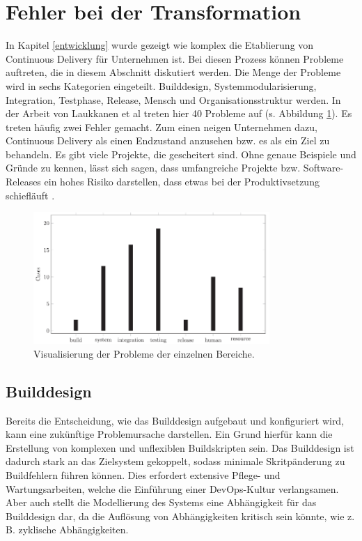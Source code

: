 \section{Fehler bei der Transformation} \label{Fehler bei der Transformation}
In Kapitel \ref{entwicklung} wurde gezeigt wie komplex die Etablierung von Continuous Delivery für Unternehmen ist. Bei diesen Prozess können Probleme auftreten, die in diesem Abschnitt diskutiert werden. Die Menge der Probleme wird in sechs Kategorien eingeteilt. Builddesign, Systemmodularisierung, Integration, Testphase, Release, Mensch und Organisationsstruktur werden. In der Arbeit von Laukkanen et al treten hier 40 Probleme auf (s. Abbildung \ref{studie}). Es treten häufig zwei Fehler gemacht. Zum einen neigen Unternehmen dazu, Continuous Delivery als einen Endzustand anzusehen bzw. es als ein Ziel zu behandeln. Es gibt viele Projekte, die gescheitert sind. Ohne genaue Beispiele und Gründe zu kennen, lässt sich sagen, dass umfangreiche Projekte bzw. Software-Releases ein hohes Risiko darstellen, dass etwas bei der Produktivsetzung schiefläuft \cite{Laukkanen.2017}. 

\begin{figure}[ht]
	\centering
	\includegraphics[width=0.8\textwidth,]{images/Transformationproblems}
	\caption{Visualisierung der Probleme der einzelnen Bereiche\cite{Laukkanen.2017}.}
	\label{studie}
\end{figure}

\subsection{Builddesign} \label{builddesgin}
Bereits die Entscheidung, wie das Builddesign aufgebaut und konfiguriert wird, kann eine zukünftige Problemursache darstellen. Ein Grund hierfür kann die Erstellung von komplexen und unflexiblen Buildskripten sein. Das Builddesign ist dadurch stark an das Zielsystem gekoppelt, sodass minimale Skritpänderung zu Buildfehlern führen können. Dies erfordert extensive Pflege- und Wartungsarbeiten, welche die Einführung einer DevOps-Kultur verlangsamen. Aber auch stellt die Modellierung des Systems eine Abhängigkeit für das Builddesign dar, da die Auflösung von Abhängigkeiten kritisch sein könnte, wie z. B. zyklische Abhängigkeiten.

